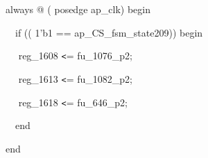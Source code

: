 

{\color{color02} always} @ ({\color{color05} posedge} ap\_clk) {\color{color02} begin}

\,\,\,\,{\color{color02} if} (({\color{color06} 1'b1} == ap\_CS\_fsm\_state209)) {\color{color02} begin}

\,\,\,\,\,\,\,\,reg\_1608 \texttt{<}= fu\_1076\_p2;

\,\,\,\,\,\,\,\,reg\_1613 \texttt{<}= fu\_1082\_p2;

\,\,\,\,\,\,\,\,reg\_1618 \texttt{<}= fu\_646\_p2;

\,\,\,\,{\color{color02} end}

{\color{color02} end}

